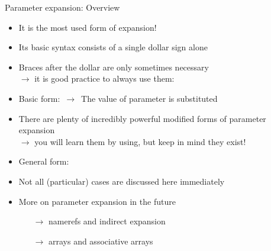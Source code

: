 \begin{frame}{Parameter expansion: Overview}
    \vspace{-3mm}
    \begin{itemize}
        \item It is the most used form of expansion!
        \item Its basic syntax consists of a single dollar sign alone
        \item Braces after the dollar are only sometimes necessary\\
              $\to$ it is good practice to always use them: \PP{\texttt{\$\{\ldots\}}}
        \item Basic form:  $\,\to\,$ The value of parameter is substituted
        \item There are plenty of incredibly powerful modified forms of parameter expansion\\
              $\to$ you will learn them by using, but \alert{keep in mind they exist}!
        \item General form: 
        \item Not all (particular) cases are discussed here immediately
        \item More on parameter expansion in the future\\
              \begin{itemize}
                  \item[$\to$] namerefs and indirect expansion
                  \item[$\to$] arrays and associative arrays
              \end{itemize}
    \end{itemize}
\end{frame}
